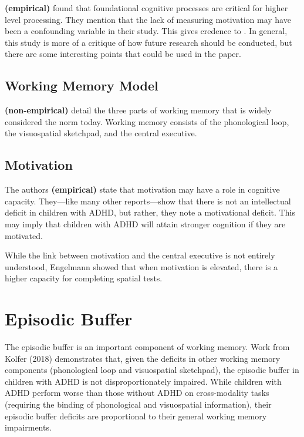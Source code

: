 \documentclass[stu]{apa7}
\begin{document}
\textcite{mohamed_basic_2021} \textbf{(empirical)} found that foundational cognitive processes are critical for higher level processing. They mention that the lack of measuring motivation may have been a confounding variable in their study. This gives credence to \textcite{skalski_impact_2021}. In general, this study is more of a critique of how future research should be conducted, but there are some interesting points that could be used in the paper.

\subsection{Working Memory Model}

\textcite{baddeley_developments_1994} \textbf{(non-empirical)} detail the three parts of working memory that is widely considered the norm today. Working memory consists of the phonological loop, the visuospatial sketchpad, and the central executive. 

\subsection{Motivation}
The authors \textcite{skalski_impact_2021} \textbf{(empirical)} state that motivation may have a role in cognitive capacity. They---like many other reports---show that there is not an intellectual deficit in children with ADHD, but rather, they note a motivational deficit. This may imply that children with ADHD will attain stronger cognition if they are motivated.

While the link between motivation and the central executive is not entirely understood, Engelmann showed that when motivation is elevated, there is a higher capacity for completing spatial tests. 

\section{Episodic Buffer}

The episodic buffer is an important component of working memory. Work from Kolfer (2018) demonstrates that, given the deficits in other working memory components (phonological loop and visuospatial sketchpad), the episodic buffer in children with ADHD is not disproportionately impaired. While children with ADHD perform worse than those without ADHD on cross-modality tasks (requiring the binding of phonological and visuospatial information), their episodic buffer deficits are proportional to their general working memory impairments.
\end{document}
